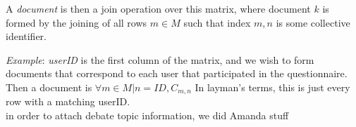 A \emph{document} is then a join operation over this matrix, where document $k$ is formed by the joining of all rows $m \in M$ such that index $m,n$ is some collective identifier.

\emph{Example}: \emph{userID} is the first column of the matrix, and we wish to form documents that correspond to each user that participated in the questionnaire. Then a document is $\forall m \in M | n = ID ,C_{m,n}$ In layman's terms, this is just every row with a matching userID.\\

in order to attach debate topic information, we did Amanda stuff
